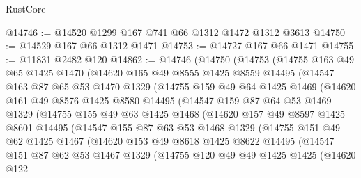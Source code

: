 \begin{lexlean}{RustCore}
\begin{coremodule}
@14746 := @14520 @1299 @167 @741 @66 @1312 @1472 @1312 @3613
@14750 := @14529 @167 @66 @1312 @1471
@14753 := @14727 @167 @66 @1471
@14755 := @11831 @2482 @120
@14862 := @14746
    (@14750
      (@14753
        (@14755
          @163
          @49
          @65
          @1425
          @1470
          (@14620
            @165
            @49
            @8555
            @1425
            @8559
            @14495
            (@14547
              @163
              @87
              @65
              @53
              @1470
              @1329
              (@14755
                @159
                @49
                @64
                @1425
                @1469
                (@14620
                  @161
                  @49
                  @8576
                  @1425
                  @8580
                  @14495
                  (@14547
                    @159
                    @87
                    @64
                    @53
                    @1469
                    @1329
                    (@14755
                      @155
                      @49
                      @63
                      @1425
                      @1468
                      (@14620
                        @157
                        @49
                        @8597
                        @1425
                        @8601
                        @14495
                        (@14547
                          @155
                          @87
                          @63
                          @53
                          @1468
                          @1329
                          (@14755
                            @151
                            @49
                            @62
                            @1425
                            @1467
                            (@14620
                              @153
                              @49
                              @8618
                              @1425
                              @8622
                              @14495
                              (@14547
                                @151
                                @87
                                @62
                                @53
                                @1467
                                @1329
                                (@14755
                                  @120
                                  @49
                                  @49
                                  @1425
                                  @1425
                                  (@14620
                                    @122

\end{coremodule}
\end{lexlean}
